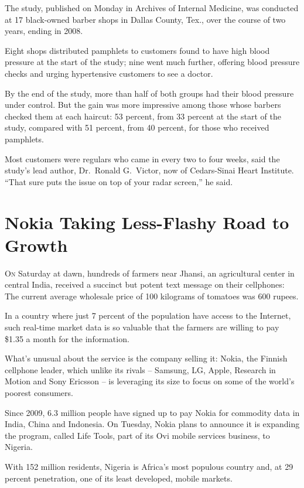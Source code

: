 ﻿\documentclass[12pt]{article}
\begin{document}
The study, published on Monday in Archives of Internal Medicine, was conducted at 17 black-owned
barber shops in Dallas County, Tex., over the course of two years, ending in 2008.

Eight shops distributed pamphlets to customers found to have high blood pressure at the start of the
study; nine went much further, offering blood pressure checks and urging hypertensive customers to
see a doctor.

By the end of the study, more than half of both groups had their blood pressure under control. But
the gain was more impressive among those whose barbers checked them at each haircut: 53 percent,
from 33 percent at the start of the study, compared with 51 percent, from 40 percent, for those who
received pamphlets.

Most customers were regulars who came in every two to four weeks, said the study's lead author,
Dr.~Ronald G.~Victor, now of Cedars-Sinai Heart Institute. ``That sure puts the issue on top of your
radar screen,'' he said.


\section{Nokia Taking Less-Flashy Road to Growth}

\lettrine{O}{n} Saturday at dawn, hundreds of farmers near Jhansi, an
agricultural center in central India, received a succinct but potent text message on their
cellphones: The current average wholesale price of 100 kilograms of tomatoes was 600 rupees.

In a country where just 7 percent of the population have access to the Internet, such real-time
market data is so valuable that the farmers are willing to pay \$1.35 a month for the information.

What's unusual about the service is the company selling it: Nokia, the Finnish cellphone leader,
which unlike its rivals -- Samsung, LG, Apple, Research in Motion and Sony Ericsson -- is leveraging
its size to focus on some of the world's poorest consumers.

Since 2009, 6.3 million people have signed up to pay Nokia for commodity data in India, China and
Indonesia. On Tuesday, Nokia plans to announce it is expanding the program, called Life Tools, part
of its Ovi mobile services business, to Nigeria.

With 152 million residents, Nigeria is Africa's most populous country and, at 29 percent
penetration, one of its least developed, mobile markets.
\end{document}
